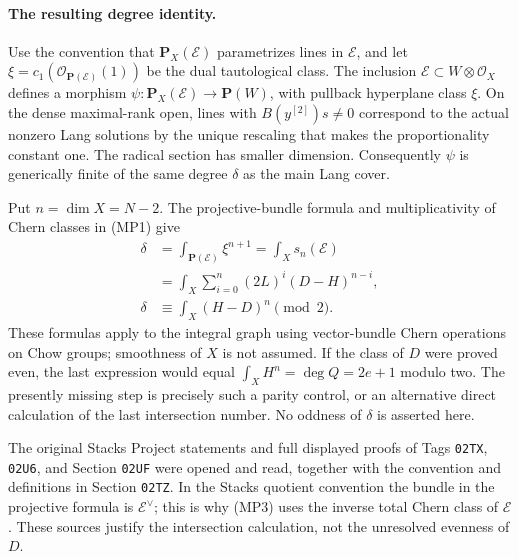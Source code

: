 \paragraph{The resulting degree identity.}
Use the convention that \(\mathbf P_X(\mathcal E)\) parametrizes
lines in \(\mathcal E\), and let
\(\xi=c_1(\mathcal O_{\mathbf P(\mathcal E)}(1))\) be the dual
tautological class.  The inclusion \(\mathcal E\subset
W\otimes\mathcal O_X\) defines a morphism
\(\psi:\mathbf P_X(\mathcal E)\to\mathbf P(W)\), with pullback
hyperplane class \(\xi\).  On the dense maximal-rank open, lines
with \(B(y^{[2]})s\ne0\) correspond to the actual nonzero Lang
solutions by the unique rescaling that makes the proportionality
constant one.  The radical section has smaller dimension.
Consequently \(\psi\) is generically finite of the same degree
\(\delta\) as the main Lang cover.

Put \(n=\dim X=N-2\).  The projective-bundle formula and
multiplicativity of Chern classes in (MP1) give
\[
 \begin{aligned}
 \delta&=\int_{\mathbf P(\mathcal E)}\xi^{n+1}
      =\int_X s_n(\mathcal E)\\
      &=\int_X\sum_{i=0}^{n}(2L)^i(D-H)^{n-i},\\
 \delta&\equiv\int_X(H-D)^n\pmod2.                              \tag{MP3}
 \end{aligned}
\]
These formulas apply to the integral graph using vector-bundle
Chern operations on Chow groups; smoothness of \(X\) is not assumed.
If the class of \(D\) were proved even, the last expression would
equal \(\int_XH^n=\deg Q=2e+1\) modulo two.  The presently missing
step is precisely such a parity control, or an alternative direct
calculation of the last intersection number.  No oddness of
\(\delta\) is asserted here.

The original Stacks Project statements and full displayed proofs
of Tags \texttt{02TX}, \texttt{02U6}, and Section \texttt{02UF}
were opened and read, together with the convention and definitions
in Section \texttt{02TZ}.  In the Stacks quotient convention the
bundle in the projective formula is \(\mathcal E^\vee\);
this is why (MP3) uses the inverse total Chern class of
\(\mathcal E\).  These sources justify the intersection calculation,
not the unresolved evenness of \(D\).

